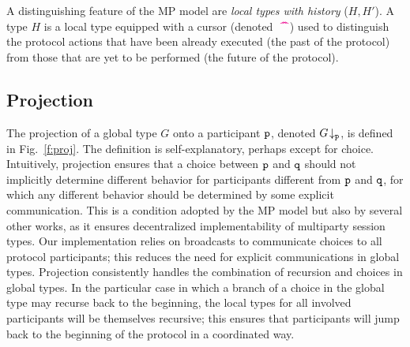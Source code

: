 \documentclass[runningheads,plain]{llncs}
\begin{document}
 A distinguishing feature of the MP model are \emph{local types with history}  ($H, H'$). A type $H$ is a local type equipped with a
 cursor (denoted~$\,\textcolor{magenta}{\text{\textbf{\textasciicircum\!\!\textasciicircum}}}$) used to distinguish  the  protocol actions  that have been already executed (the past of the protocol) from those that are yet to be performed (the future of the protocol).
 
 \subsection{Projection}\label{projection}
The projection of a global type $G$ onto a participant $\mathtt{p}$, denoted $G\!\downarrow_{\mathtt{p}}$,  is defined in Fig.~\ref{f:proj}. 
 The definition is   self-explanatory, perhaps except for choice.
 Intuitively, projection ensures that a choice between $\mathtt{p}$ and $\mathtt{q}$ should not implicitly determine different behavior for participants different from $\mathtt{p}$ and $\mathtt{q}$, for which any different behavior should  be determined by some explicit communication.
 This is a condition adopted by the MP model but also by several other works, as it ensures decentralized implementability of  multiparty session types.
 {Our implementation relies on broadcasts to communicate choices to all protocol participants; this reduces the need for explicit communications in global types}. 
Projection consistently handles 
the combination of recursion and choices in global types. 
In the particular case in which a branch of a choice in the global type may recurse back to the beginning, 
the local types for all involved participants will be themselves recursive; this ensures that 
participants will jump back to the beginning of the protocol in a coordinated way.
\end{document}
